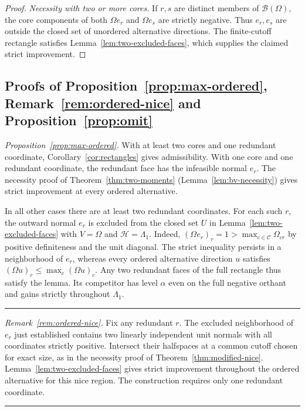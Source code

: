 \documentclass[11pt]{article}
\newcommand{\red}[1]{{\color{red}#1}} %
\numberwithin{equation}{section}
\def\qed{\rule{2mm}{2mm}}
\theoremstyle{definition}
\begin{document}
{\begin{proof}
{\emph{Necessity with two or more cores.}
If $r,s$ are distinct members of $\mathcal B(\Omega)$, the core components of both $\Omega e_r$ and $\Omega e_s$ are strictly negative. Thus $e_r,e_s$ are outside the closed set of unordered alternative directions. The finite-cutoff rectangle satisfies Lemma~\ref{lem:two-excluded-faces}, which supplies the claimed strict improvement.}
\end{proof}
}

\red{%
\subsection{Proofs of Proposition~\ref{prop:max-ordered}, Remark~\ref{rem:ordered-nice} and Proposition~\ref{prop:omit}}\label{app:ordered-and-omission}

\emph{Proposition~\ref{prop:max-ordered}.}
With at least two cores and one redundant coordinate, Corollary~\ref{cor:rectangles} gives admissibility. With one core and one redundant coordinate, the redundant face has the infeasible normal $e_r$. The necessity proof of Theorem~\ref{thm:two-moments} (Lemma~\ref{lem:bv-necessity}) gives strict improvement at every ordered alternative.

In all other cases there are at least two redundant coordinates. For each such $r$, the outward normal $e_r$ is excluded from the closed set $U$ in Lemma~\ref{lem:two-excluded-faces} with $V=\Omega$ and $\mathcal H=\Lambda_1$. Indeed, $(\Omega e_r)_r=1>\max_{c\in\mathcal C}\Omega_{cr}$ by positive definiteness and the unit diagonal. The strict inequality persists in a neighborhood of $e_r$, whereas every ordered alternative direction $u$ satisfies $(\Omega u)_r\le\max_c(\Omega u)_c$. Any two redundant faces of the full rectangle thus satisfy the lemma. Its competitor has level $\alpha$ even on the full negative orthant and gains strictly throughout $\Lambda_1$. \qed

\medskip
\noindent\emph{Remark~\ref{rem:ordered-nice}.}
Fix any redundant $r$. The excluded neighborhood of $e_r$ just established contains two linearly independent unit normals with all coordinates strictly positive. Intersect their halfspaces at a common cutoff chosen for exact size, as in the necessity proof of Theorem~\ref{thm:modified-nice}. Lemma~\ref{lem:two-excluded-faces} gives strict improvement throughout the ordered alternative for this nice region. The construction requires only one redundant coordinate. \qed

}
\end{document}
